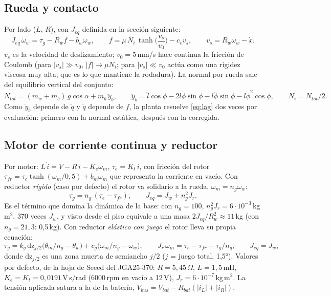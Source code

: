 \documentclass[11pt,a4paper]{article}
\begin{document}
\subsection{Rueda y contacto}

Por lado ($L$, $R$), con $J_{eq}$ definida en la sección siguiente:
\begin{equation}
  J_{eq}\,\dot\omega_w = \tau_g - R_w f - b_w\omega_w, \qquad
  f = \mu\,N_i\,\tanh\!\Big(\frac{v_s}{v_0}\Big) - c_v v_s, \qquad v_s = R_w\omega_w - \dot x .
  \label{eq:rueda}
\end{equation}
$v_s$ es la velocidad de deslizamiento; $v_0 = 5$\,mm/s hace continua la fricción de Coulomb (para
$|v_s| \gg v_0$, $|f| \to \mu N_i$; para $|v_s| \ll v_0$ actúa como una rigidez viscosa muy alta,
que es lo que mantiene la rodadura). La normal por rueda sale del equilibrio vertical del conjunto:
\begin{equation}
  N_{tot} = (m_w + m_b)\,g\cos\alpha + m_b\,\ddot y_b, \qquad
  \ddot y_b = \ddot l\cos\phi - 2\dot l\dot\phi\sin\phi - l\ddot\phi\sin\phi - l\dot\phi^2\cos\phi, \qquad N_i = N_{tot}/2 .
\end{equation}
Como $\ddot y_b$ depende de $\ddot q$ y $\ddot q$ depende de $f$, la planta resuelve \eqref{eq:lag}
dos veces por evaluación: primero con la normal estática, después con la corregida.

\subsection{Motor de corriente continua y reductor}

Por motor: $L\,\dot i = V - R\,i - K_e\omega_m$, $\tau_e = K_t\,i$, con fricción del rotor
$\tau_{fr} = \tau_c\tanh(\omega_m/0{,}5) + b_m\omega_m$ que representa la corriente en vacío.
Con reductor \emph{rígido} (caso por defecto) el rotor va solidario a la rueda, $\omega_m = n_g\omega_w$:
\begin{equation}
  \tau_g = n_g\,(\tau_e - \tau_{fr}), \qquad J_{eq} = J_w + n_g^2 J_r .
  \label{eq:jeq}
\end{equation}
Es el término que domina la dinámica de la base: con $n_g = 100$, $n_g^2 J_r = 6\cdot10^{-3}$\,kg\,m$^2$,
370 veces $J_w$, y visto desde el piso equivale a una masa $2J_{eq}/R_w^2 \approx 11$\,kg (con
$n_g = 21{,}3$: 0{,}5\,kg). Con reductor \emph{elástico con juego} el rotor lleva su propia ecuación:
\begin{equation}
  \tau_g = k_g\,\mathrm{dz}_{j/2}\!\big(\theta_m/n_g - \theta_w\big) + c_g\big(\omega_m/n_g - \omega_w\big), \qquad
  J_r\,\dot\omega_m = \tau_e - \tau_{fr} - \tau_g/n_g, \qquad J_{eq} = J_w,
\end{equation}
donde $\mathrm{dz}_{j/2}$ es una zona muerta de semiancho $j/2$ ($j$ = juego total, 1{,}5°).
Valores por defecto, de la hoja de Seeed del JGA25-370: $R = 5{,}45\,\Omega$, $L = 1{,}5$\,mH,
$K_e = K_t = 0{,}0191$\,V\,s/rad (6000\,rpm en vacío a 12\,V), $J_r = 6\cdot10^{-7}$\,kg\,m$^2$.
La tensión aplicada satura a la de la batería, $V_{bus} = V_{bat} - R_{bat}(|i_L| + |i_R|)$.
\end{document}
